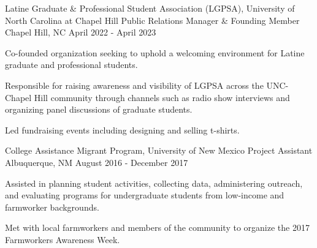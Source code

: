 \begin{cventries}
  
  \cventry
    {Latine Graduate \& Professional Student Association (LGPSA), University of North Carolina at Chapel Hill} %
    {Public Relations Manager \& Founding Member} %
    {Chapel Hill, NC} %
    {April 2022 - April 2023} %
    {
      \begin{cvitems} %
        \item Co-founded organization seeking to uphold a welcoming environment for Latine graduate and professional students.
        \item Responsible for raising awareness and visibility of LGPSA across the UNC-Chapel Hill community through channels such as \newline radio show interviews and organizing panel discussions of graduate students.
        \item Led fundraising events including designing and selling t-shirts.
      \end{cvitems}
    }

    \cventry
    {College Assistance Migrant Program, University of New Mexico } %
    {Project Assistant} %
    {Albuquerque, NM} %
    {August 2016 - December 2017} %
    {
      \begin{cvitems} %
       \item Assisted in planning student activities, collecting data, administering outreach, and evaluating programs for undergraduate \newline students from low-income and farmworker backgrounds. 
       \item Met with local farmworkers and members of the community to organize the 2017 Farmworkers Awareness Week. 
      \end{cvitems}
    }





\end{cventries}

